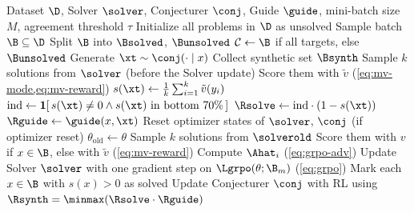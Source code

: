 \begin{algorithm}[tb]
  \caption{SGS-GRPO with majority-vote rewards (on-policy Solver update)}
  \label{alg:sgs-grpo-mv}
  \begin{algorithmic}[1]
     Dataset $\D$, Solver $\solver$, Conjecturer $\conj$, Guide $\guide$, mini-batch size $M$, agreement threshold $\tau$
    \STATE Initialize all problems in $\D$ as unsolved
      \STATE Sample batch $\B \subseteq \D$
      \STATE Split $\B$ into $\Bsolved$, $\Bunsolved$
      \STATE $\mathcal{C} \leftarrow \B$ if all targets, else $\Bunsolved$
        \STATE Generate $\xt \sim \conj(\cdot \mid x)$
      \ENDFOR
      \STATE Collect synthetic set $\Bsynth$
        \STATE Sample $k$ solutions from $\solver$ (before the Solver update)
        \STATE Score them with $\tilde{v}$ (\cref{eq:mv-mode,eq:mv-reward})
        \STATE $s(\xt) \leftarrow \frac{1}{k}\sum_{i=1}^{k} \tilde{v}(y_i)$
        \STATE $\text{ind} \leftarrow \mathbf{1}[\, s(\xt) \neq 0 \land s(\xt) \text{ in bottom } 70\% \,]$
        \STATE $\Rsolve \leftarrow \text{ind} \cdot (1 - s(\xt))$
        \STATE $\Rguide \leftarrow \guide(x, \xt)$
      \ENDFOR
      \STATE Reset optimizer states of $\solver$, $\conj$ (if optimizer reset)
        \STATE $\theta_{\mathrm{old}} \leftarrow \theta$
          \STATE Sample $k$ solutions from $\solverold$
          \STATE Score them with $v$ if $x \in \B$, else with $\tilde{v}$ (\cref{eq:mv-reward})
          \STATE Compute $\Ahat_i$ (\cref{eq:grpo-adv})
        \ENDFOR
        \STATE Update Solver $\solver$ with one gradient step on $\Lgrpo(\theta; \B_m)$ (\cref{eq:grpo})
      \ENDFOR
      \STATE Mark each $x \in \B$ with $s(x) > 0$ as solved
      \STATE Update Conjecturer $\conj$ with RL using $\Rsynth = \minmax(\Rsolve \cdot \Rguide)$
    \ENDFOR
  \end{algorithmic}
\end{algorithm}
